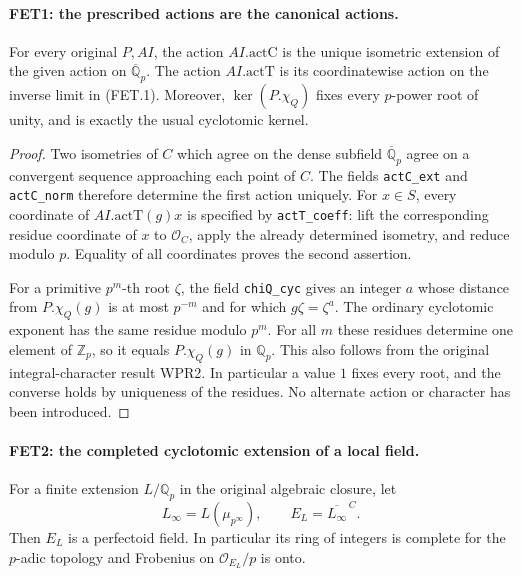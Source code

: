 \documentclass[11pt,a4paper]{article}
\numberwithin{equation}{section}
\theoremstyle{remark}\newtheorem{remark}[theorem]{Remark}
\begin{document}
\paragraph{FET1: the prescribed actions are the canonical actions.}
\label{claim:FET1}
For every original $P,AI$, the action $AI.\mathrm{actC}$ is the
unique isometric extension of the given action on
$\overline{\mathbb Q}_p$. The action $AI.\mathrm{actT}$ is its
coordinatewise action on the inverse limit in (FET.1). Moreover,
$\ker(P.\chi_Q)$ fixes every $p$-power root of unity, and is exactly
the usual cyclotomic kernel.

\begin{proof}
Two isometries of $C$ which agree on the dense subfield
$\overline{\mathbb Q}_p$ agree on a convergent sequence approaching
each point of $C$. The fields \texttt{act\allowbreak C\_\allowbreak ext} and
\texttt{act\allowbreak C\_\allowbreak norm} therefore determine the first action uniquely.
For $x\in S$, every coordinate of $AI.\mathrm{actT}(g)x$ is
specified by \texttt{act\allowbreak T\_\allowbreak coeff}: lift the corresponding residue
coordinate of $x$ to $\mathcal O_C$, apply the already determined
isometry, and reduce modulo $p$. Equality of all coordinates proves
the second assertion.

For a primitive $p^m$-th root $\zeta$, the field
\texttt{chi\allowbreak Q\_\allowbreak cyc} gives an integer $a$ whose distance from
$P.\chi_Q(g)$ is at most $p^{-m}$ and for which $g\zeta=\zeta^a$.
The ordinary cyclotomic exponent has the same residue modulo $p^m$.
For all $m$ these residues determine one element of $\mathbb Z_p$,
so it equals $P.\chi_Q(g)$ in $\mathbb Q_p$.
This also follows from the original integral-character result WPR2.
In particular a value $1$ fixes every root, and the converse holds by
uniqueness of the residues. No alternate action or character has been
introduced.
\end{proof}

\paragraph{FET2: the completed cyclotomic extension of a local field.}
\label{claim:FET2}
For a finite extension $L/\mathbb Q_p$ in the original algebraic
closure, let
\[
 L_\infty=L(\mu_{p^\infty}),\qquad
 E_L=\overline{L_\infty}^{\,C}.
\]
Then $E_L$ is a perfectoid field. In particular its ring of integers
is complete for the $p$-adic topology and Frobenius on
$\mathcal O_{E_L}/p$ is onto.
\end{document}
